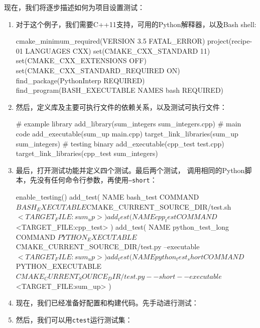
现在，我们将逐步描述如何为项目设置测试：

\begin{enumerate}
\item 对于这个例子，我们需要C++11支持，可用的Python解释器，以及Bash shell:

\begin{codebox}[cmake]
cmake_minimum_required(VERSION 3.5 FATAL_ERROR)
project(recipe-01 LANGUAGES CXX)
set(CMAKE_CXX_STANDARD 11)
set(CMAKE_CXX_EXTENSIONS OFF)
set(CMAKE_CXX_STANDARD_REQUIRED ON)
find_package(PythonInterp REQUIRED)
find_program(BASH_EXECUTABLE NAMES bash REQUIRED)
\end{codebox}

\item 然后，定义库及主要可执行文件的依赖关系，以及测试可执行文件：

\begin{codebox}[cmake]
# example library
add_library(sum_integers sum_integers.cpp)
# main code
add_executable(sum_up main.cpp)
target_link_libraries(sum_up sum_integers)
# testing binary
add_executable(cpp_test test.cpp)
target_link_libraries(cpp_test sum_integers)
\end{codebox}

\item 最后，打开测试功能并定义四个测试。最后两个测试， 调用相同的Python脚本，先没有任何命令行参数，再使用\texttt{--short}：

\begin{codebox}[cmake]
enable_testing()
add_test(
  NAME bash_test
  COMMAND ${BASH_EXECUTABLE} ${CMAKE_CURRENT_SOURCE_DIR}/test.sh $<TARGET_FILE:sum_up>
  )
add_test(
  NAME cpp_test
  COMMAND $<TARGET_FILE:cpp_test>
  )
add_test(
  NAME python_test_long
  COMMAND ${PYTHON_EXECUTABLE} ${CMAKE_CURRENT_SOURCE_DIR}/test.py --executable $<TARGET_FILE:sum_up>
  )
add_test(
  NAME python_test_short
  COMMAND ${PYTHON_EXECUTABLE} ${CMAKE_CURRENT_SOURCE_DIR}/test.py --short --executable $<TARGET_FILE:sum_up>
  )
\end{codebox}

\item 现在，我们已经准备好配置和构建代码。先手动进行测试：


\item 然后，我们可以用\texttt{ctest}运行测试集：


\end{enumerate}
